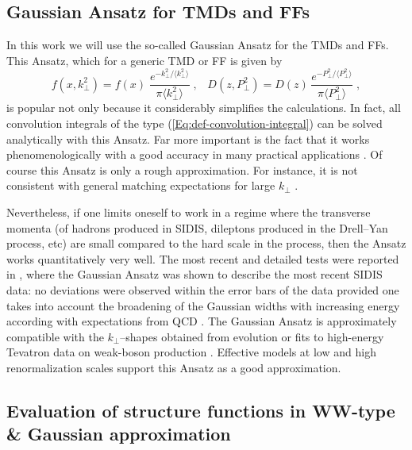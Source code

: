 \documentclass[a4paper,11pt]{article}
\newcommand{\be}{\begin{equation}}
\newcommand{\ee}{\end{equation}}
\newcommand{\la}{\langle}
\newcommand{\ra}{\rangle}
\def\kperp{k_\perp}
\def\pperp{P_\perp}
\def\avkperp{\la \kperp^2 \ra}
\def\avpperp{\la \pperp^2 \ra}
\begin{document}
\subsection{Gaussian Ansatz for TMDs and FFs}
\label{Sec-4.3:evaluation}

In this work we will use the so-called Gaussian Ansatz for the TMDs and FFs.
This Ansatz, which for a generic TMD or FF is given by
\be\label{Eq:Gauss-generic}
    f(x,\kperp^2) = f(x)\;
    \frac{e^{-\kperp^2/\avkperp}}{\pi\avkperp} \;,\;\;\;
    D(z,\pperp^2) = D(z)\,
    \frac{e^{-\pperp^2/\avpperp}}{\pi\avpperp}\;,
\ee
is popular not only because it considerably simplifies the
calculations. In fact, all convolution integrals of the type 
(\ref{Eq:def-convolution-integral}) can be solved analytically 
with this Ansatz. Far more important is the fact that it works 
phenomenologically with a good accuracy in many practical applications
\cite{Anselmino:2005nn,Collins:2005ie,D'Alesio:2007jt,Schweitzer:2010tt,
Signori:2013mda,Anselmino:2013lza}.
Of course this Ansatz is only a rough approximation. For instance, 
it is not consistent with general matching expectations for large 
$\kperp$ \cite{Bacchetta:2008xw}. 

Nevertheless, if one limits oneself to work in a regime where the 
transverse momenta (of hadrons produced in SIDIS, dileptons produced
in the Drell--Yan process, etc) are small compared to the hard
scale in the process, then the Ansatz works quantitatively
very well. The most recent and detailed tests were reported in 
\cite{Schweitzer:2010tt}, where the Gaussian Ansatz was shown to
describe the most recent SIDIS data: no deviations were observed 
within the error bars of the data provided one takes into account 
the broadening of the Gaussian widths with increasing energy 
\cite{Schweitzer:2010tt} according
with expectations from QCD \cite{Aybat:2011zv}.
The Gaussian Ansatz is approximately compatible with 
the $\kperp$--shapes obtained from evolution \cite{Aybat:2011zv}
or fits to high-energy Tevatron data on weak-boson production
\cite{Landry:2002ix}. Effective models at 
low \cite{Pasquini:2008ax,Avakian:2010br,Lorce:2011dv} and 
high \cite{Efremov:2009ze} renormalization scales support this
Ansatz as a good approximation.

\subsection{Evaluation of structure functions in WW-type \&
 Gaussian approximation}
\label{Sec-4.4:evaluation}
\end{document}
